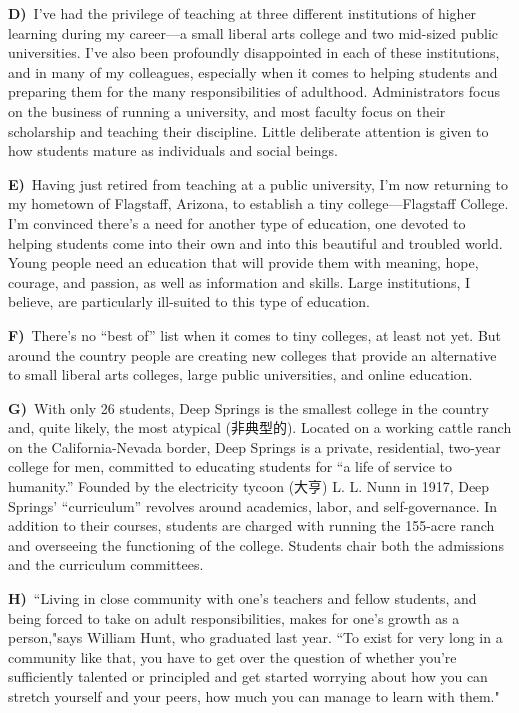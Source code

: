 \smallskip
\noindent\textbf{D)}\ I've had the privilege of teaching at three different institutions of higher learning during my career---a small liberal arts college and two mid-sized public universities. I've also been profoundly disappointed in each of these institutions, and in many of my colleagues, especially when it comes to helping students and preparing them for the many responsibilities of adulthood. Administrators focus on the business of running a university, and most faculty focus on their scholarship and teaching their discipline. Little deliberate attention is given to how students mature as individuals and social beings.\par
\smallskip
\noindent\textbf{E)}\ Having just retired from teaching at a public university, I'm now returning to my hometown of Flagstaff, Arizona, to establish a tiny college---Flagstaff College. I'm convinced there's a need for another type of education, one devoted to helping students come into their own and into this beautiful and troubled world. Young people need an education that will provide them with meaning, hope, courage, and passion, as well as information and skills. Large institutions, I believe, are particularly ill-suited to this type of education.\par
\smallskip
\noindent\textbf{F)}\ There's no ``best of'' list when it comes to tiny colleges, at least not yet. But around the country people are creating new colleges that provide an alternative to small liberal arts colleges, large public universities, and online education.\par
\smallskip
\noindent\textbf{G)}\ With only 26 students, Deep Springs is the smallest college in the country and, quite likely, the most atypical (非典型的). Located on a working cattle ranch on the California-Nevada border, Deep Springs is a private, residential, two-year college for men, committed to educating students for ``a life of service to humanity.'' Founded by the electricity tycoon (大亨) L. L. Nunn in 1917, Deep Springs' ``curriculum'' revolves around academics, labor, and self-governance. In addition to their courses, students are charged with running the 155-acre ranch and overseeing the functioning of the college. Students chair both the admissions and the curriculum committees.\par
\smallskip
\noindent\textbf{H)}\ ``Living in close community with one's teachers and fellow students, and being forced to take on adult responsibilities, makes for one's growth as a person,"says William Hunt, who graduated last year. ``To exist for very long in a community like that, you have to get over the question of whether you're sufficiently talented or principled and get started worrying about how you can stretch yourself and your peers, how much you can manage to learn with them."\par
